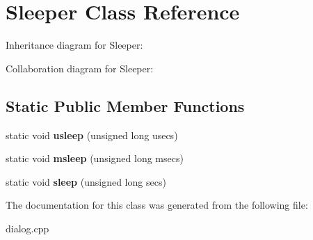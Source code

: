 \hypertarget{classSleeper}{}\section{Sleeper Class Reference}
\label{classSleeper}


Inheritance diagram for Sleeper\+:


Collaboration diagram for Sleeper\+:
\subsection*{Static Public Member Functions}
\begin{DoxyCompactItemize}
\item 
static void {\bfseries usleep} (unsigned long usecs)\hypertarget{classSleeper_a646cd8aad5fd393e6bc4b2bddc0ed4d0}{}\label{classSleeper_a646cd8aad5fd393e6bc4b2bddc0ed4d0}

\item 
static void {\bfseries msleep} (unsigned long msecs)\hypertarget{classSleeper_ab16be5dcf9deb9f4c0aac6ac67e8e1c0}{}\label{classSleeper_ab16be5dcf9deb9f4c0aac6ac67e8e1c0}

\item 
static void {\bfseries sleep} (unsigned long secs)\hypertarget{classSleeper_a827224cea731f3e369502ca3e79615e9}{}\label{classSleeper_a827224cea731f3e369502ca3e79615e9}

\end{DoxyCompactItemize}


The documentation for this class was generated from the following file\+:\begin{DoxyCompactItemize}
\item 
dialog.\+cpp\end{DoxyCompactItemize}

